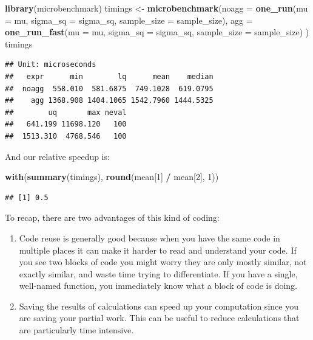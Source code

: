 \documentclass[
]{book}
\newenvironment{Shaded}{\begin{snugshade}}{\end{snugshade}}
\newcommand{\AttributeTok}[1]{\textcolor[rgb]{0.13,0.29,0.53}{#1}}
\newcommand{\DecValTok}[1]{\textcolor[rgb]{0.00,0.00,0.81}{#1}}
\newcommand{\FunctionTok}[1]{\textcolor[rgb]{0.13,0.29,0.53}{\textbf{#1}}}
\newcommand{\NormalTok}[1]{#1}
\newcommand{\OtherTok}[1]{\textcolor[rgb]{0.56,0.35,0.01}{#1}}
\newcommand{\SpecialCharTok}[1]{\textcolor[rgb]{0.81,0.36,0.00}{\textbf{#1}}}
\begin{document}
\begin{Shaded}
\begin{Highlighting}[]
\FunctionTok{library}\NormalTok{(microbenchmark)}
\NormalTok{timings }\OtherTok{\textless{}{-}} \FunctionTok{microbenchmark}\NormalTok{(}\AttributeTok{noagg =} \FunctionTok{one\_run}\NormalTok{(}\AttributeTok{mu =}\NormalTok{ mu, }\AttributeTok{sigma\_sq =}\NormalTok{ sigma\_sq, }
                                          \AttributeTok{sample\_size =}\NormalTok{ sample\_size),}
                          \AttributeTok{agg =} \FunctionTok{one\_run\_fast}\NormalTok{(}\AttributeTok{mu =}\NormalTok{ mu, }\AttributeTok{sigma\_sq =}\NormalTok{ sigma\_sq, }
                                             \AttributeTok{sample\_size =}\NormalTok{ sample\_size) )}
\NormalTok{timings}
\end{Highlighting}
\end{Shaded}

\begin{verbatim}
## Unit: microseconds
##   expr      min        lq      mean    median
##  noagg  558.010  581.6875  749.1028  619.0795
##    agg 1368.908 1404.1065 1542.7960 1444.5325
##        uq       max neval
##   641.199 11698.120   100
##  1513.310  4768.546   100
\end{verbatim}

And our relative speedup is:

\begin{Shaded}
\begin{Highlighting}[]
\FunctionTok{with}\NormalTok{(}\FunctionTok{summary}\NormalTok{(timings), }\FunctionTok{round}\NormalTok{(mean[}\DecValTok{1}\NormalTok{] }\SpecialCharTok{/}\NormalTok{ mean[}\DecValTok{2}\NormalTok{], }\DecValTok{1}\NormalTok{))}
\end{Highlighting}
\end{Shaded}

\begin{verbatim}
## [1] 0.5
\end{verbatim}

To recap, there are two advantages of this kind of coding:

\begin{enumerate}
\def\labelenumi{\arabic{enumi}.}
\item
  Code reuse is generally good because when you have the same code in multiple places it can make it harder to read and understand your code. If you see two blocks of code you might worry they are only mostly similar, not exactly similar, and waste time trying to differentiate. If you have a single, well-named function, you immediately know what a block of code is doing.
\item
  Saving the results of calculations can speed up your computation since you are saving your partial work. This can be useful to reduce calculations that are particularly time intensive.
\end{enumerate}
\end{document}

